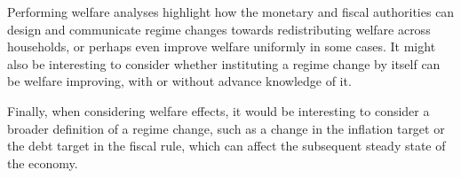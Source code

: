 \documentclass[11pt]{article}
\begin{document}
Performing welfare analyses highlight how the monetary and fiscal authorities can design and communicate regime changes towards redistributing welfare across households, or perhaps even improve welfare uniformly in some cases. It might also be interesting to consider whether instituting a regime change by itself can be welfare improving, with or without advance knowledge of it.

Finally, when considering welfare effects, it would be interesting to consider a broader definition of a regime change, such as a change in the inflation target or the debt target in the fiscal rule, which can affect the subsequent steady state of the economy.
\end{document}
